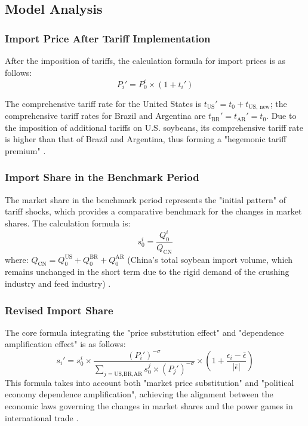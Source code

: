 \documentclass{apmcmthesis}
\begin{document}
\subsection{Model Analysis}
\subsubsection{Import Price After Tariff Implementation}
After the imposition of tariffs, the calculation formula for import prices is as follows:
\begin{equation}
P_{i}' = P_{0}^{i} \times \left(1 + t_{i}'\right)
\end{equation}

The comprehensive tariff rate for the United States is $t_{\text{US}}' = t_0 + t_{\text{US, new}}$; 
the comprehensive tariff rates for Brazil and Argentina are $t_{\text{BR}}' = t_{\text{AR}}' = t_0$. 
Due to the imposition of additional tariffs on U.S. soybeans, its comprehensive tariff rate is higher than that of Brazil and Argentina, thus forming a "hegemonic tariff premium" \cite{whitehouse2025reciprocal}.

\subsubsection{Import Share in the Benchmark Period}
The market share in the benchmark period represents the "initial pattern" of tariff shocks, which provides a comparative benchmark for the changes in market shares. The calculation formula is:
\begin{equation}
s_{0}^{i} = \frac{Q_{0}^{i}}{Q_{\text{CN}}}
\end{equation}
where: $Q_{\text{CN}} = Q_{0}^{\text{US}} + Q_{0}^{\text{BR}} + Q_{0}^{\text{AR}}$ (China's total soybean import volume, which remains unchanged in the short term due to the rigid demand of the crushing industry and feed industry) \cite{gacc2025stats}.

\subsubsection{Revised Import Share}
The core formula integrating the "price substitution effect" and "dependence amplification effect" is as follows:
\[
s_i' = s_0^i \times \frac{(P_i')^{-\sigma}}{\sum_{j=\text{US,BR,AR}} s_0^j \times (P_j')^{-\sigma}} \times \left(1 + \frac{\epsilon_i - \bar{\epsilon}}{|\bar{\epsilon}|}\right)
\]
This formula takes into account both "market price substitution" and "political economy dependence amplification", achieving the alignment between the economic laws governing the changes in market shares and the power games in international trade \cite{hudsonbay2025guide}.
\end{document}
